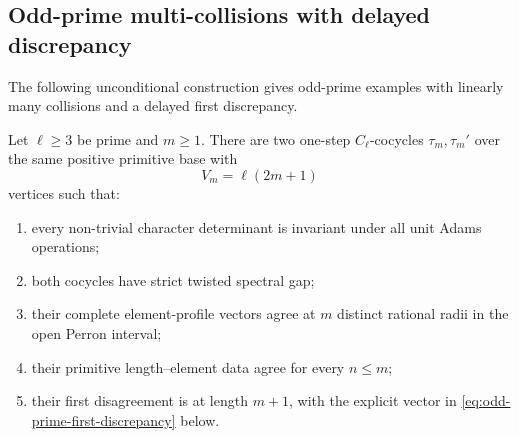 \subsection{Odd-prime multi-collisions with delayed discrepancy}
\label{sec:odd-prime-delayed-multicollisions}

The following unconditional construction gives odd-prime examples with
linearly many collisions and a delayed first discrepancy.

\begin{theorem}
\label{thm:odd-prime-delayed-multicollisions}
Let \(\ell\ge3\) be prime and \(m\ge1\).  There are two one-step
\(C_\ell\)-cocycles \(\tau_m,\tau_m'\) over the same positive primitive base
with
\[
 V_m=\ell(2m+1)
\]
vertices such that:
\begin{enumerate}[label=\textup{(\roman*)},leftmargin=*]
 \item every non-trivial character determinant is invariant under all unit
 Adams operations;
 \item both cocycles have strict twisted spectral gap;
 \item their complete element-profile vectors agree at \(m\) distinct
 rational radii in the open Perron interval;
 \item their primitive length--element data agree for every \(n\le m\);
 \item their first disagreement is at length \(m+1\), with the explicit
 vector in \eqref{eq:odd-prime-first-discrepancy} below.
\end{enumerate}
\end{theorem}

